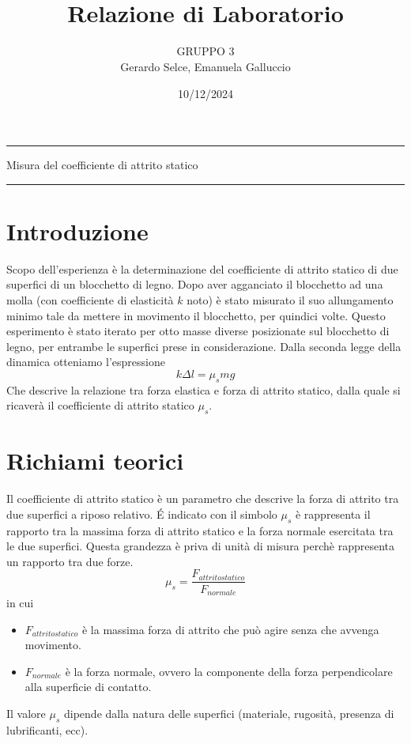 \documentclass[11pt]{article}
\begin{document}
\setlength{\parindent}{0pt}
\title{\vspace{-4em}{\large Laboratorio di Meccanica e Termodinamica} \\
    Relazione di Laboratorio}
\author{GRUPPO 3\\
        Gerardo Selce, Emanuela Galluccio}
\date{10/12/2024}
\maketitle

\vspace{-2em}\par\noindent\rule{\textwidth}{0.4pt}
\begin{center}
    {\Large\sc Misura del coefficiente di attrito statico}
\end{center}
\par\noindent\rule{\textwidth}{0.4pt}

\section{Introduzione}

Scopo dell'esperienza è la determinazione del coefficiente di attrito statico di due superfici di un blocchetto di legno. Dopo aver agganciato il blocchetto ad una molla (con coefficiente di elasticità $k$ noto) è stato misurato il suo allungamento minimo tale da mettere in movimento il blocchetto, per quindici volte. Questo esperimento è stato iterato per otto masse diverse posizionate sul blocchetto di legno, per entrambe le superfici prese in considerazione. Dalla seconda legge della dinamica otteniamo l'espressione
\begin{equation}
    k\Delta l=\mu_smg
\end{equation}
Che descrive la relazione tra forza elastica e forza di attrito statico, dalla quale si ricaverà il coefficiente di attrito statico $\mu_s$.

\section{Richiami teorici}

Il coefficiente di attrito statico è un parametro che descrive la forza di attrito tra due superfici a riposo relativo. É indicato con il simbolo $\mu_s$ è rappresenta il rapporto tra la massima forza di attrito statico e la forza normale esercitata tra le due superfici. Questa grandezza è priva di unità di misura perchè rappresenta un rapporto tra due forze.
\begin{equation}
    \mu_s = \frac{F_{attrito statico}}{F_{normale}}
\end{equation}
in cui
\begin{itemize}
    \item $F_{attritostatico}$ è la massima forza di attrito che può agire senza che avvenga movimento.
    \item $F_{normale}$ è la forza normale, ovvero la componente della forza perpendicolare alla superficie di contatto.
\end{itemize}
Il valore $\mu_s$ dipende dalla natura delle superfici (materiale, rugosità, presenza di lubrificanti, ecc).
\end{document}
